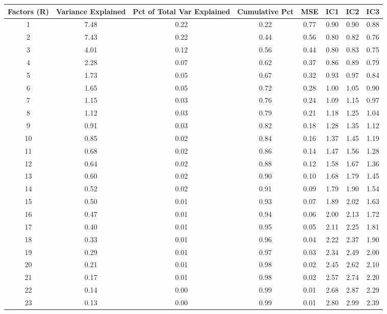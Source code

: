 \documentclass[11pt, letterpaper]{article}\usepackage[]{graphicx}\usepackage[]{color}
\begin{document}
\begin{table}[H]
\centering
\begingroup\scriptsize
\begin{tabular}{cccccccc}
  \hline
Factors (R) & Variance Explained & Pct of Total Var Explained & Cumulative Pct & MSE & IC1 & IC2 & IC3 \\ 
  \hline
  1 & 7.48 & 0.22 & 0.22 & 0.77 & 0.90 & 0.90 & 0.88 \\ 
    2 & 7.43 & 0.22 & 0.44 & 0.56 & 0.80 & 0.82 & 0.76 \\ 
    3 & 4.01 & 0.12 & 0.56 & 0.44 & 0.80 & 0.83 & 0.75 \\ 
    4 & 2.28 & 0.07 & 0.62 & 0.37 & 0.86 & 0.89 & 0.79 \\ 
    5 & 1.73 & 0.05 & 0.67 & 0.32 & 0.93 & 0.97 & 0.84 \\ 
    6 & 1.65 & 0.05 & 0.72 & 0.28 & 1.00 & 1.05 & 0.90 \\ 
    7 & 1.15 & 0.03 & 0.76 & 0.24 & 1.09 & 1.15 & 0.97 \\ 
    8 & 1.12 & 0.03 & 0.79 & 0.21 & 1.18 & 1.25 & 1.04 \\ 
    9 & 0.91 & 0.03 & 0.82 & 0.18 & 1.28 & 1.35 & 1.12 \\ 
   10 & 0.85 & 0.02 & 0.84 & 0.16 & 1.37 & 1.45 & 1.19 \\ 
   11 & 0.68 & 0.02 & 0.86 & 0.14 & 1.47 & 1.56 & 1.28 \\ 
   12 & 0.64 & 0.02 & 0.88 & 0.12 & 1.58 & 1.67 & 1.36 \\ 
   13 & 0.60 & 0.02 & 0.90 & 0.10 & 1.68 & 1.79 & 1.45 \\ 
   14 & 0.52 & 0.02 & 0.91 & 0.09 & 1.79 & 1.90 & 1.54 \\ 
   15 & 0.50 & 0.01 & 0.93 & 0.07 & 1.89 & 2.02 & 1.63 \\ 
   16 & 0.47 & 0.01 & 0.94 & 0.06 & 2.00 & 2.13 & 1.72 \\ 
   17 & 0.40 & 0.01 & 0.95 & 0.05 & 2.11 & 2.25 & 1.81 \\ 
   18 & 0.33 & 0.01 & 0.96 & 0.04 & 2.22 & 2.37 & 1.90 \\ 
   19 & 0.29 & 0.01 & 0.97 & 0.03 & 2.34 & 2.49 & 2.00 \\ 
   20 & 0.21 & 0.01 & 0.98 & 0.02 & 2.45 & 2.62 & 2.10 \\ 
   21 & 0.17 & 0.01 & 0.98 & 0.02 & 2.57 & 2.74 & 2.20 \\ 
   22 & 0.14 & 0.00 & 0.99 & 0.01 & 2.68 & 2.87 & 2.29 \\ 
   23 & 0.13 & 0.00 & 0.99 & 0.01 & 2.80 & 2.99 & 2.39 \\ 

\end{tabular}
\end{table}
\end{document}
